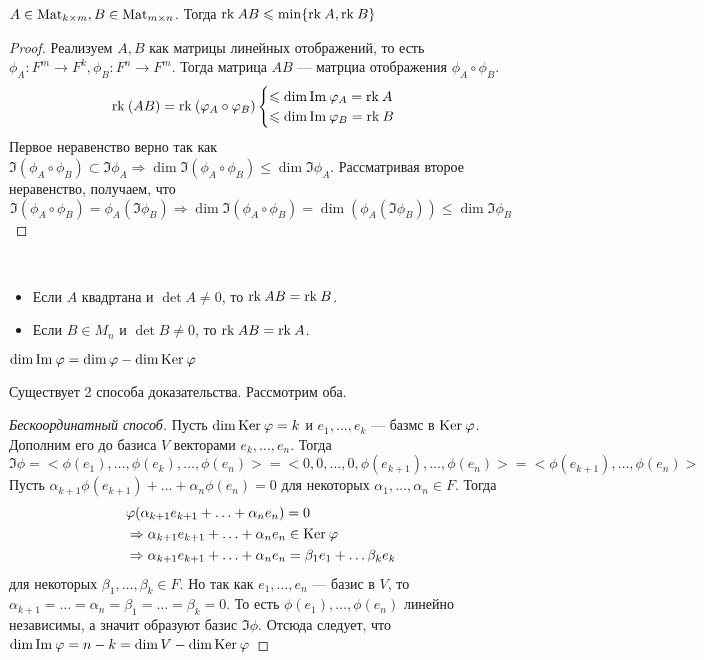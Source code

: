\begin{Consequence}
    $A \in \mathrm{Mat}_{k\times m}, B\in \mathrm{Mat}_{m\times n}$. Тогда $\mathrm{rk}\: AB \leqslant \min\{\mathrm{rk}\: A, \mathrm{rk}\: B\}$
\end{Consequence}
\begin{proof}
    Реализуем $A, B$ как матрицы линейных отображений, то есть $\phi_A\colon F^m \rightarrow F^k, \phi_B\colon F^n \rightarrow F^m$. Тогда матрица $AB$ --- матрциа отображения $\phi_A \circ \phi_B$.
    \[
        \mathrm{rk}\:(AB) = \mathrm{rk}\: (\varphi_A\circ\varphi_B)
        \begin{cases}
            \leqslant \dim \mathrm{Im\:} \varphi_A = \mathrm{rk}\: A \\
            \leqslant \dim \mathrm{Im\:} \varphi_B = \mathrm{rk}\: B 

        \end{cases}
    \]
Первое неравенство верно так как $\Im(\phi_A\circ \phi_B) \subset \Im \phi_A \Rightarrow \dim \Im (\phi_A\circ \phi_B) \leqslant \dim \Im \phi_A$. Рассматривая второе неравенство, получаем, что 
    \[
        \Im (\phi_A\circ \phi_B) = \phi_A(\Im \phi_B) \Rightarrow \dim \Im (\phi_A\circ \phi_B)= \dim(\phi_A(\Im\phi_B)) \leqslant \dim\Im \phi_B
    \]
\end{proof}
\begin{Task}
    \ 
    \begin{itemize}
        \item Если $A$ квадртана и $\det A \neq 0$, то $\mathrm{rk}\: AB = \mathrm{rk}\: B$.
        \item Если $B \in M_n$ и $\det B \neq 0$, то $\mathrm{rk}\: AB = \mathrm{rk}\: A$.
    \end{itemize}
\end{Task}
\begin{Theorem}
    $\dim \mathrm{Im\:} \varphi = \dim \varphi - \dim \mathrm{Ker}\: \varphi$
\end{Theorem}
Существует 2 способа доказательства. Рассмотрим оба.
\begin{proof}[Бескоординатный способ]
     Пусть $\dim \mathrm{Ker}\: \varphi = k$ и $e_1, \ldots, e_k$ --- базмс в $\mathrm{Ker}\: \varphi$. Дополним его до базиса $V$ векторами $e_k, \ldots, e_n$. Тогда
    \[
        \Im \phi = <\phi(e_1), \ldots, \phi(e_k), \ldots, \phi(e_n)> = <0, 0, \ldots, 0, \phi(e_{k+1}), \ldots, \phi(e_n)> = <\phi(e_{k+1}), \ldots, \phi(e_{n})>
    \]
Пусть $\alpha_{k+1}\phi(e_{k+1}) + \ldots + \alpha_n\phi(e_n) = 0$ для некоторых $\alpha_1, \ldots, \alpha_n \in F$. Тогда 
\begin{align*}
    &\varphi(\alpha_{k+1}e_{k+1} + \ldots + \alpha_ne_n) = 0 \\
    &\Rightarrow \alpha_{k+1}e_{k+1} + \ldots + \alpha_ne_n \in \mathrm{Ker}\: \varphi \\
    &\Rightarrow \alpha_{k+1}e_{k+1} + \ldots + \alpha_ne_n = \beta_1e_1 + \ldots \beta_ke_k
\end{align*}
для некоторых $\beta_1, \ldots, \beta_k \in F$. Но так как $e_1, \ldots, e_n$ --- базис в $V$, то $\alpha_{k+1} =  \ldots = \alpha_n = \beta_1 = \ldots = \beta_k = 0$. То есть $\phi(e_1), \ldots, \phi(e_n)$ линейно независимы, а значит образуют базис $\Im \phi$. Отсюда следует, что $\dim\mathrm{Im\:}\varphi = n - k = \dim V - \dim\mathrm{Ker}\:\varphi$
\end{proof}
